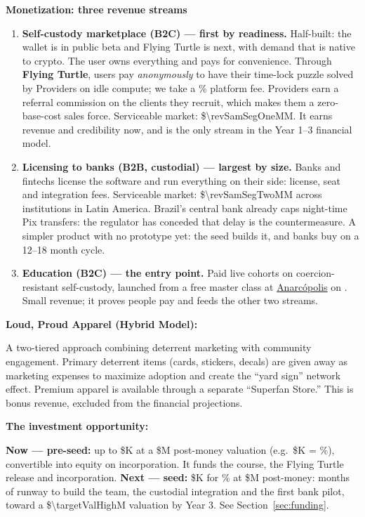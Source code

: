 \textbf{Monetization: three revenue streams} \par
\begin{enumerate}
    \item \textbf{Self-custody marketplace (B2C) --- first by readiness.} Half-built: the wallet is in public beta and Flying Turtle is next, with demand that is native to crypto. The user owns everything and pays for convenience. Through \textbf{Flying Turtle}, users pay \emph{anonymously} to have their time-lock puzzle solved by Providers on idle compute; we take a \markPlatformFeePercent\% platform fee. Providers earn a referral commission on the clients they recruit, which makes them a zero-base-cost sales force. Serviceable market: \$\num[round-precision=1]{\revSamSegOneM}M. It earns revenue and credibility now, and is the only stream in the Year 1--3 financial model.
    \item \textbf{Licensing to banks (B2B, custodial) --- largest by size.} Banks and fintechs license the software and run everything on their side: license, seat and integration fees. Serviceable market: \$\num[round-precision=1]{\revSamSegTwoM}M across \numint{\samSegTwoInstitutions} institutions in Latin America. Brazil's central bank already caps night-time Pix transfers: the regulator has conceded that delay is the countermeasure. A simpler product with no prototype yet: the seed builds it, and banks buy on a 12--18 month cycle.
    \item \textbf{Education (B2C) --- the entry point.} Paid live cohorts on coercion-resistant self-custody, launched from a free master class at \href{\anarcurl}{Anarcópolis} on \masterclassDate. Small revenue; it proves people pay and feeds the other two streams.
\end{enumerate}

\textbf{Loud, Proud Apparel (Hybrid Model):} \par
A two-tiered approach combining deterrent marketing with community engagement. Primary deterrent items (cards, stickers, decals) are given away as marketing expenses to maximize adoption and create the ``yard sign'' network effect. Premium apparel is available through a separate ``Superfan Store.'' This is bonus revenue, excluded from the financial projections.

\textbf{The investment opportunity:} \par
\textbf{Now --- pre-seed:} up to \$K at a \$M post-money valuation (e.g.\ \$K = \%), convertible into equity on incorporation. It funds the course, the Flying Turtle release and incorporation.
\textbf{Next --- seed:} \$K for \numint{\seedEquity}\% at \$M post-money: \numint{\seedRunwayMonths} months of runway to build the team, the custodial integration and the first bank pilot, toward a \$\num{\targetValHigh}M valuation by Year 3. See Section~\ref{sec:funding}.


